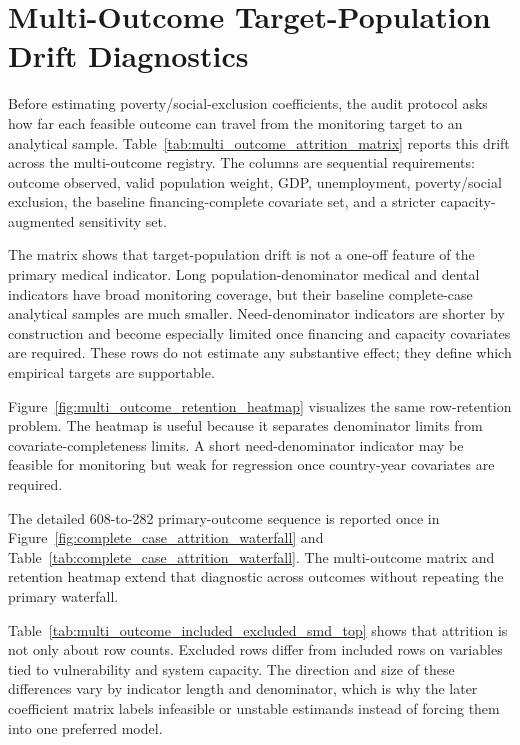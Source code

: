 \section{Multi-Outcome Target-Population Drift Diagnostics}

Before estimating poverty/social-exclusion coefficients, the audit protocol asks how far each feasible outcome can travel from the monitoring target to an analytical sample. Table~\ref{tab:multi_outcome_attrition_matrix} reports this drift across the multi-outcome registry. The columns are sequential requirements: outcome observed, valid population weight, GDP, unemployment, poverty/social exclusion, the baseline financing-complete covariate set, and a stricter capacity-augmented sensitivity set.

The matrix shows that target-population drift is not a one-off feature of the primary medical indicator. Long population-denominator medical and dental indicators have broad monitoring coverage, but their baseline complete-case analytical samples are much smaller. Need-denominator indicators are shorter by construction and become especially limited once financing and capacity covariates are required. These rows do not estimate any substantive effect; they define which empirical targets are supportable.

Figure~\ref{fig:multi_outcome_retention_heatmap} visualizes the same row-retention problem. The heatmap is useful because it separates denominator limits from covariate-completeness limits. A short need-denominator indicator may be feasible for monitoring but weak for regression once country-year covariates are required.

The detailed 608-to-282 primary-outcome sequence is reported once in Figure~\ref{fig:complete_case_attrition_waterfall} and Table~\ref{tab:complete_case_attrition_waterfall}. The multi-outcome matrix and retention heatmap extend that diagnostic across outcomes without repeating the primary waterfall.

Table~\ref{tab:multi_outcome_included_excluded_smd_top} shows that attrition is not only about row counts. Excluded rows differ from included rows on variables tied to vulnerability and system capacity. The direction and size of these differences vary by indicator length and denominator, which is why the later coefficient matrix labels infeasible or unstable estimands instead of forcing them into one preferred model.

